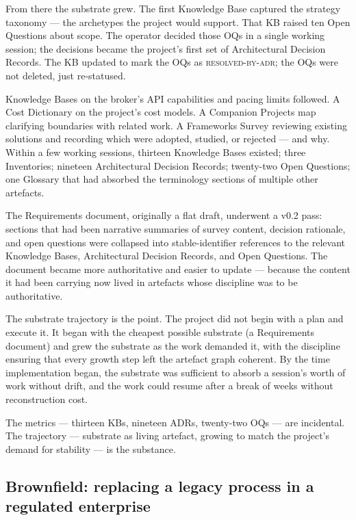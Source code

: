 \documentclass[11pt,a4paper,twocolumn]{article}
\begin{document}
From there the substrate grew. The first Knowledge Base captured
the strategy taxonomy --- the archetypes the project would support.
That KB raised ten Open Questions about scope. The operator
decided those OQs in a single working session; the
decisions became the project's first set of Architectural Decision
Records. The KB updated to mark the OQs as
\textsc{resolved-by-adr}; the OQs were not deleted, just
re-statused.

Knowledge Bases on the broker's API capabilities and pacing limits
followed. A Cost Dictionary on the project's cost models. A
Companion Projects map clarifying boundaries with related work. A
Frameworks Survey reviewing existing solutions and recording which
were adopted, studied, or rejected --- and why. Within a few
working sessions, thirteen Knowledge Bases existed; three
Inventories; nineteen Architectural Decision Records; twenty-two
Open Questions; one Glossary that had absorbed the terminology
sections of multiple other artefacts.

The Requirements document, originally a flat draft, underwent a
v0.2 pass: sections that had been narrative summaries of survey
content, decision rationale, and open questions were collapsed into
stable-identifier references to the relevant Knowledge Bases,
Architectural Decision Records, and Open Questions. The document
became more authoritative and easier to update --- because the
content it had been carrying now lived in artefacts whose
discipline was to be authoritative.

The substrate trajectory is the point. The project did not begin
with a plan and execute it. It began with the cheapest possible
substrate (a Requirements document) and grew the substrate as the
work demanded it, with the discipline ensuring that every growth
step left the artefact graph coherent. By the time implementation
began, the substrate was sufficient to absorb a session's worth of
work without drift, and the work could resume after a break
of weeks without reconstruction cost.

The metrics --- thirteen KBs, nineteen ADRs, twenty-two OQs ---
are incidental. The trajectory --- substrate as living artefact,
growing to match the project's demand for stability --- is the
substance.

\subsection{Brownfield: replacing a legacy process in a regulated
enterprise}
\end{document}
